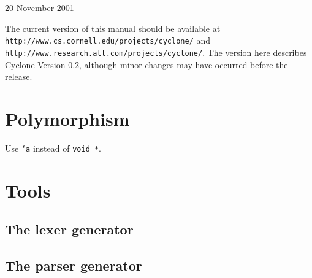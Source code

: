 \bigskip

\begin{center}
{\Large 20 November 2001}
\end{center}

\bigskip

The current version of this manual should be available at\\
\texttt{http://www.cs.cornell.edu/projects/cyclone/} and\\
\texttt{http://www.research.att.com/projects/cyclone/}.  The version
here describes Cyclone Version 0.2, although minor changes may have
occurred before the release.

\newpage

\tableofcontents
\newpage







\section{Polymorphism}
\hypertarget{polymorphism}{}

Use \texttt{`a} instead of \texttt{void *}.






\appendix







\section{Tools}

\subsection{The lexer generator}
\subsection{The parser generator}


\printindex



